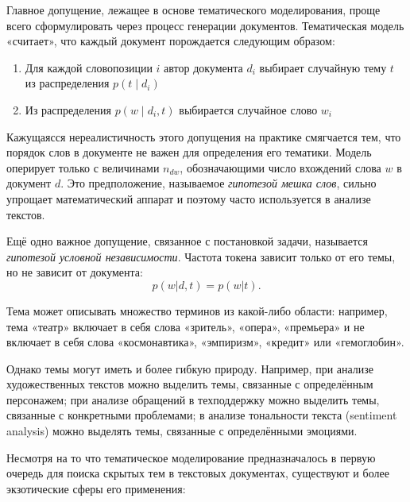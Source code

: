 Главное допущение, лежащее в основе тематического моделирования, проще всего сформулировать через процесс генерации документов. Тематическая модель «считает», что каждый документ порождается следующим образом:
\begin{enumerate}
    \item{Для каждой словопозиции $i$ автор документа $d_i$ выбирает случайную тему $t$ из распределения $p(t \mid d_i)$}
    \item{Из распределения $p(w \mid d_i,t)$ выбирается случайное слово $w_i$}
\end{enumerate}

Кажущаясся нереалистичность этого допущения на практике смягчается тем, что порядок слов в документе не важен для определения его тематики. Модель оперирует только с величинами $n_{dw}$, обозначающими число вхождений слова $w$ в документ $d$. Это предположение, называемое  \textit{гипотезой мешка слов}, сильно упрощает математический аппарат и поэтому часто используется в анализе текстов.

Ещё одно важное допущение, связанное с постановкой задачи, называется \textit{гипотезой условной независимости}. Частота токена зависит только от его темы, но не зависит от документа:
\begin{equation}
    p(w| d,t) = p(w| t).
\end{equation}

Тема может описывать множество терминов из какой-либо области: например, тема «театр» включает в себя слова «зритель», «опера», «премьера» и не включает в себя слова «космонавтика», «эмпиризм», «кредит» или «гемоглобин».

Однако темы могут иметь и более гибкую природу. Например, при анализе художественных текстов можно выделить темы, связанные с определённым персонажем; при анализе обращений в техподдержку можно выделить темы, связанные с конкретными проблемами; в анализе тональности текста (sentiment analysis) можно выделять темы, связанные с определёнными эмоциями.

Несмотря на то что тематическое моделирование предназначалось в первую очередь для поиска скрытых тем в текстовых документах, существуют и более экзотические сферы его применения:

